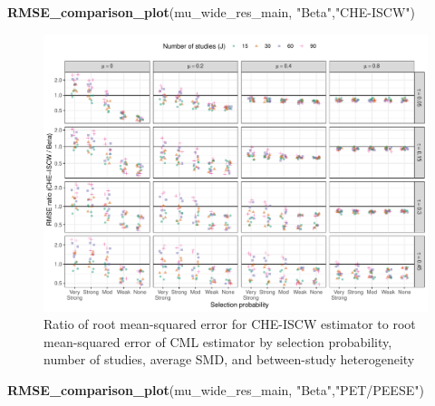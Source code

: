 \documentclass[
]{article}
\newenvironment{Shaded}{\begin{snugshade}}{\end{snugshade}}
\newcommand{\FunctionTok}[1]{\textcolor[rgb]{0.13,0.29,0.53}{\textbf{#1}}}
\newcommand{\NormalTok}[1]{#1}
\newcommand{\StringTok}[1]{\textcolor[rgb]{0.31,0.60,0.02}{#1}}
\begin{document}
\begin{Shaded}
\begin{Highlighting}[]
\FunctionTok{RMSE\_comparison\_plot}\NormalTok{(mu\_wide\_res\_main, }\StringTok{"Beta"}\NormalTok{,}\StringTok{"CHE{-}ISCW"}\NormalTok{)}
\end{Highlighting}
\end{Shaded}

\begin{figure}
\includegraphics{appendix-simulation-results_files/figure-latex/rmse-CHE-Beta-main-1} \caption{Ratio of root mean-squared error for CHE-ISCW estimator to root mean-squared error of CML estimator by selection probability, number of studies, average SMD, and between-study heterogeneity}\label{fig:rmse-CHE-Beta-main}
\end{figure}

\begin{Shaded}
\begin{Highlighting}[]
\FunctionTok{RMSE\_comparison\_plot}\NormalTok{(mu\_wide\_res\_main, }\StringTok{"Beta"}\NormalTok{,}\StringTok{"PET/PEESE"}\NormalTok{)}
\end{Highlighting}
\end{Shaded}
\end{document}
